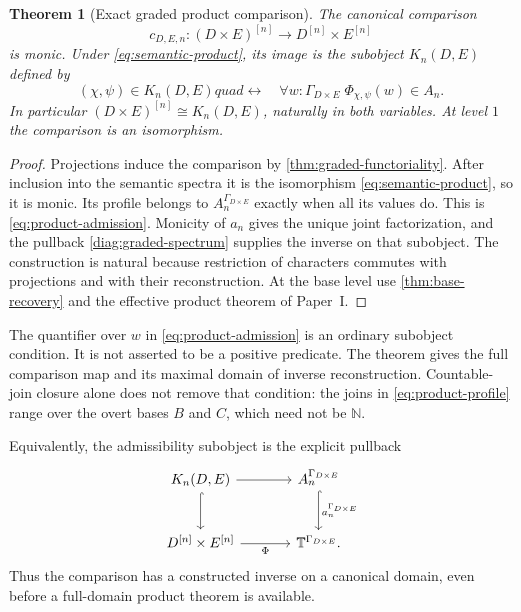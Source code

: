 \documentclass[11pt,a4paper]{article}
\numberwithin{equation}{section}
\newtheorem{theorem}{Theorem}[section]
\theoremstyle{definition}
\theoremstyle{remark}
\theoremstyle{plain}
\newcommand{\N}{\mathbb N}
\newcommand{\TV}{\mathbb T}
\begin{document}
\begin{theorem}[Exact graded product comparison]
\label{thm:graded-product-domain}
The canonical comparison
\[
 c_{D,E,n}:(D\times E)^{[n]}\longrightarrow D^{[n]}\times E^{[n]}
\]
is monic. Under \eqref{eq:semantic-product}, its image is the subobject
$K_n(D,E)$ defined by
\begin{equation}\label{eq:product-admission}
 (\chi,\psi)\in K_n(D,E)quad\longleftrightarrow\quad
 \forall w:\Gamma_{D\times E}\;
       \Phi_{\chi,\psi}(w)\in A_n.
\end{equation}
In particular $(D\times E)^{[n]}\cong K_n(D,E)$, naturally in both
variables. At level $1$ the comparison is an isomorphism.
\end{theorem}
\begin{proof}
Projections induce the comparison by \cref{thm:graded-functoriality}.
After inclusion into the semantic spectra it is the isomorphism
\eqref{eq:semantic-product}, so it is monic. Its profile belongs to
$A_n^{\Gamma_{D\times E}}$ exactly when all its values do. This is
\eqref{eq:product-admission}. Monicity of $a_n$ gives the unique
joint factorization, and the pullback
\eqref{diag:graded-spectrum} supplies the inverse on that subobject.
The construction is natural because restriction of characters commutes
with projections and with their reconstruction. At the base level use
\cref{thm:base-recovery} and the effective product theorem of Paper~I.
\end{proof}

The quantifier over $w$ in \eqref{eq:product-admission} is an ordinary
subobject condition. It is not asserted to be a positive predicate.
The theorem gives the full comparison map and its maximal domain of
inverse reconstruction. Countable-join closure alone does not remove
that condition: the joins in \eqref{eq:product-profile} range over
the overt bases $B$ and $C$, which need not be $\N$.

Equivalently, the admissibility subobject is the explicit pullback
\begin{equation}\label{diag:product-admission}
\begin{tikzcd}[column sep=large,row sep=large]
 K_n(D,E)\ar[r]\ar[d,hook]&
 A_n^{\Gamma_{D\times E}}\ar[d,hook,"a_n^{\Gamma_{D\times E}}"]\\
 D^{[n]}\times E^{[n]}\ar[r,"\Phi"']&
 \TV^{\Gamma_{D\times E}}.
\end{tikzcd}
\end{equation}
Thus the comparison has a constructed inverse on a canonical domain,
even before a full-domain product theorem is available.
\end{document}
